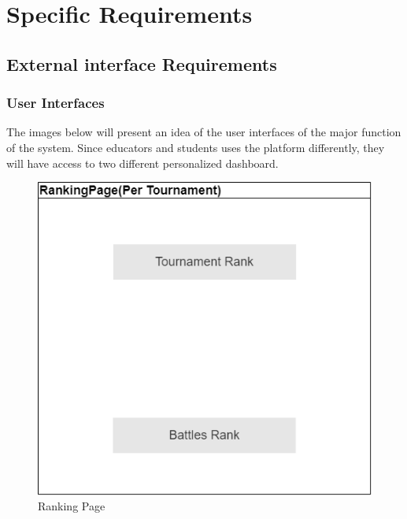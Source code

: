 \chapter{Specific Requirements}

\section{External interface Requirements}
\subsection{User Interfaces}
The images below will present an idea of the user interfaces of the major function of the system. Since educators and students uses the platform differently, they will have access to two different personalized dashboard.
      \begin{figure}[H]
        \centering
        \includegraphics[scale=0.50]{images/interfaces_3.png}
        \caption{Ranking Page}
        \label{fig:rank}
    \end{figure}
    \clearpage
